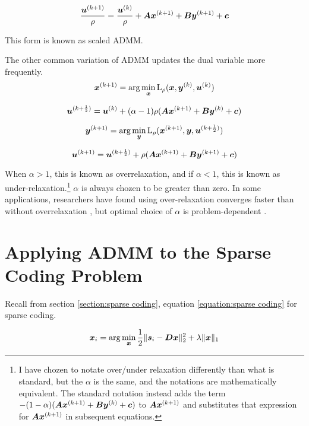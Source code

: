 \begin{equation}
\frac{\bm{u}^{(k + 1)}}{\rho} = \frac{\bm{u}^{(k)}}{\rho} + \bm{A}\bm{x}^{(k + 1)} + \bm{B}\bm{y}^{(k + 1)} + \bm{c}
\end{equation}

This form is known as scaled ADMM.

The other common variation of ADMM updates the dual variable more frequently.
\begin{equation}
\bm{x}^{(k + 1)} = \arg\min_{\bm{x}} \operatorname{L}_{\rho}(\bm{x},\bm{y}^{(k)},\bm{u}^{(k)})
\end{equation}

\begin{equation}
\bm{u}^{(k + \frac{1}{2})} = \bm{u}^{(k)} + (\alpha - 1)\rho(\bm{A}\bm{x}^{(k + 1)} + \bm{B}\bm{y}^{(k)} + \bm{c})
\end{equation}

\begin{equation}
\bm{y}^{(k + 1)} = \arg\min_{\bm{y}} \operatorname{L}_{\rho}(\bm{x}^{(k + 1)},\bm{y},\bm{u}^{(k + \frac{1}{2})})
\end{equation}

\begin{equation}
\bm{u}^{(k + 1)} = \bm{u}^{(k + \frac{1}{2})} + \rho(\bm{A}\bm{x}^{(k + 1)} + \bm{B}\bm{y}^{(k + 1)} + \bm{c})
\end{equation}

When $\alpha > 1$, this is known as overrelaxation, and if $\alpha < 1$, this is known as under-relaxation.\footnote{I have chozen to notate over/under relaxation differently than what is standard, but the $\alpha$ is the same, and the notations are mathematically equivalent. The standard notation instead adds the term $-(1 - \alpha)(\bm{A}\bm{x}^{(k + 1)} + \bm{B}\bm{y}^{(k)} + \bm{c})$ to $\bm{A}\bm{x}^{(k + 1)}$ and substitutes that expression for $\bm{A}\bm{x}^{(k + 1)}$ in subsequent equations.} $\alpha$ is always chozen to be greater than zero. In some applications, researchers have found using over-relaxation converges faster than without overrelaxation \cite{eckstein1994parallel}, but optimal choice of $\alpha$ is problem-dependent \cite{nishihara2015general}.


\section{Applying ADMM to the Sparse Coding Problem}
Recall from section \ref{section:sparse coding}, equation \ref{equation:sparse coding} for sparse coding.

\begin{equation}
\bm{x}_i = \arg\min_{\bm{x}} \frac{1}{2}\|\bm{s}_i - \bm{D}\bm{x}\|_2^2 + \lambda \|\bm{x}\|_1
\end{equation}

